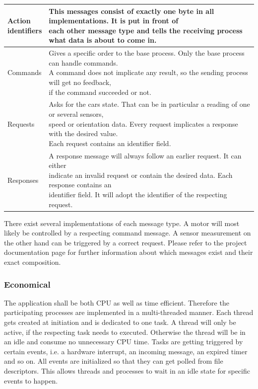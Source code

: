 \begingroup
\begin{tabular}[t]{|l|l|}
\hline
\makecell{Action\\identifiers} & \makecell{This messages consist of exactly one byte in all implementations. It is put in front of\\each other message type and tells the receiving process what data is about to come in.}\\
\hline
Commands & \makecell{Gives a specific order to the base process. Only the base process can handle commands.\\A command does not implicate any result, so the sending process will get no feedback,\\if the command succeeded or not.}\\
\hline
Requests & \makecell{Asks for the cars state. That can be in particular a reading of one or several sensors,\\speed or orientation data. Every request implicates a response with the desired value.\\Each request contains an identifier field.}\\
\hline
Responses & \makecell{A response message will always follow an earlier request. It can either\\indicate an invalid request or contain the desired data. Each response contains an\\identifier field. It will adopt the identifier of the respecting request.}\\
\hline
\end{tabular}
\label{tbl:message_definition}
\endgroup

There exist several implementations of each message type. A motor will most likely be controlled by a respecting command message. A sensor measurement on the other hand can be triggered by a correct request. Please refer to the project documentation page \cite{docu} for further information about which messages exist and their exact composition.

\subsubsection{Economical}

The application shall be both CPU as well as time efficient. Therefore the participating processes are implemented in a multi-threaded manner. Each thread gets created at initiation and is dedicated to one task. A thread will only be active, if the respecting task needs to executed. Otherwise the thread will be in an idle and consume no unnecessary CPU time. Tasks are getting triggered by certain events, i.e. a hardware interrupt, an incoming message, an expired timer and so on. All events are initialized so that they can get polled from file descriptors. This allows threads and processes to wait in an idle state for specific events to happen.\\

